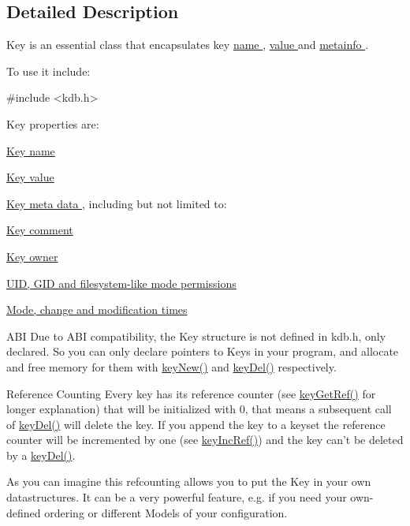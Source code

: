 \subsection{Detailed Description}
Key is an essential class that encapsulates key \hyperlink{group__keyname}{name }, \hyperlink{group__keyvalue}{value } and \hyperlink{group__keymeta}{metainfo }. 

To use it include\+: 
\begin{DoxyCode}
\textcolor{preprocessor}{#include <kdb.h>}
\end{DoxyCode}


Key properties are\+:
\begin{DoxyItemize}
\item \hyperlink{group__keyname}{Key name }
\item \hyperlink{group__keyvalue}{Key value }
\item \hyperlink{group__keymeta}{Key meta data }, including but not limited to\+:
\begin{DoxyItemize}
\item \hyperlink{group__meta_gafb89735689929ff717cc9f2d0d0b46a2}{Key comment }
\item \hyperlink{owner_8c_a35922a017bee8b4bcb493bbdfad9d6f5}{Key owner }
\item \hyperlink{group__keymeta}{U\+I\+D, G\+I\+D and filesystem-\/like mode permissions }
\item \hyperlink{group__keymeta}{Mode, change and modification times }
\end{DoxyItemize}
\end{DoxyItemize}

\begin{DoxyParagraph}{A\+B\+I}
Due to A\+B\+I compatibility, the {\ttfamily Key} structure is not defined in kdb.\+h, only declared. So you can only declare {\ttfamily pointers} to {\ttfamily Keys} in your program, and allocate and free memory for them with \hyperlink{group__key_gad23c65b44bf48d773759e1f9a4d43b89}{key\+New()} and \hyperlink{group__key_ga3df95bbc2494e3e6703ece5639be5bb1}{key\+Del()} respectively.
\end{DoxyParagraph}
\begin{DoxyParagraph}{Reference Counting}
Every key has its reference counter (see \hyperlink{group__key_ga4aabc4272506dd63161db2bbb42de8ae}{key\+Get\+Ref()} for longer explanation) that will be initialized with 0, that means a subsequent call of \hyperlink{group__key_ga3df95bbc2494e3e6703ece5639be5bb1}{key\+Del()} will delete the key. If you append the key to a keyset the reference counter will be incremented by one (see \hyperlink{group__key_ga6970a6f254d67af7e39f8e469bb162f1}{key\+Inc\+Ref()}) and the key can't be deleted by a \hyperlink{group__key_ga3df95bbc2494e3e6703ece5639be5bb1}{key\+Del()}.
\end{DoxyParagraph}
\begin{DoxyParagraph}{}
As you can imagine this refcounting allows you to put the Key in your own datastructures. It can be a very powerful feature, e.\+g. if you need your own-\/defined ordering or different Models of your configuration. 
\end{DoxyParagraph}


